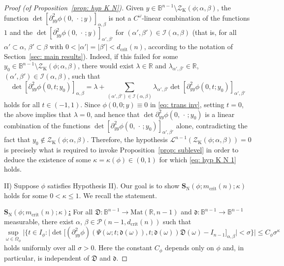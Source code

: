 \documentclass[reqno]{amsart}
\numberwithin{equation}{section}
\newcommand{\B}{\mathbb{B}}
\newcommand{\R}{\mathbb{R}}
\newcommand{\cI}{\mathcal{I}}
\newcommand{\cL}{\mathcal{L}}
\newcommand{\cP}{\mathcal{P}}
\newcommand{\cZ}{\mathcal{Z}}
\newcommand{\bS}{\mathbf{S}}
\newcommand{\fd}{\mathfrak{d}}
\newcommand{\fD}{\mathfrak{D}}
\theoremstyle{plain}
\theoremstyle{definition}
\newcommand{\tN}{\mathrm{N}}
\newcommand{\crit}{\mathrm{crit}}
\begin{document}
\begin{proof}[Proof (of Proposition~\ref{prop: hyp K N})]
Given $y\in \B^{n-1} \setminus \cZ_{\mathrm{K}}(\phi; \alpha, \beta)$, the function $\det [\partial^2_{yy}\phi (0,\,\cdot\,;y)]_{\alpha, \beta}$ is not a $C^\omega$-linear combination of the functions $1$ and the $\det[\partial^2_{yy}\phi(0,\,\cdot\,;y)]_{\alpha', \beta'}$ for $(\alpha',\beta')\in \cI(\alpha,\beta)$ (that is, for all $\alpha' \subset \alpha$, $\beta' \subset \beta$ with $0 < |\alpha'| = |\beta'| < d_{\crit}(n)$, according to the notation of Section~\ref{sec: main results}). Indeed, if this failed for some $y_0\in\B^{n-1} \setminus \cZ_{\mathrm{K}}(\phi; \alpha, \beta)$, there would exist $\lambda \in \R$ and $\lambda_{\alpha', \beta'}\in\R$, $(\alpha',\beta')\in \cI(\alpha,\beta)$, such that
\begin{equation*}
    \det[\partial^2_{yy}\phi(0,t;y_0)]_{\alpha, \beta} = \lambda + \sum_{{(\alpha', \beta') \in \cI(\alpha,\beta)}} \lambda_{\alpha', \beta'} \det[\partial^2_{yy}\phi(0,t;y_0)]_{\alpha', \beta'}
\end{equation*}
holds for all $t \in (-1,1)$. Since $\phi(0,0;y) \equiv 0$ in \eqref{eq: trans inv}, setting $t=0$, the above implies that $\lambda = 0$, and hence that $\det\partial^2_{yy}\phi(0,\,\cdot\,;y_0)$ is a linear combination of the functions $\det[\partial^2_{yy}\phi(0,\,\cdot\,;y_0)]_{\alpha', \beta'}$ alone, contradicting the fact that $y_0\notin \cZ_{\mathrm{K}}(\phi; \alpha, \beta)$. Therefore, the hypothesis  $\cL^{n-1}(\cZ_{\mathrm{K}}(\phi; \alpha, \beta)) = 0$ is precisely what is required to invoke Proposition~\ref{prop: sublevel} in order to deduce the existence of some $\kappa = \kappa(\phi) \in (0,1)$ for which \eqref{eq: hyp K N 1} holds. \medskip

\noindent II) Suppose $\phi$ satisfies Hypothesis II). Our goal is to show $\bS_{\tN}(\phi; m_{\crit}(n); \kappa)$ holds for some $0 < \kappa \leq 1$. We recall the statement. \medskip

\noindent \underline{\textbf{$\bS_{\tN}(\phi; m_{\crit}(n); \kappa)$:}} For all $\fD \colon \B^{n-1} \to \mathrm{Mat}(\R, n-1)$ and $\fd \colon \B^{n-1} \to \B^{n-1}$ measurable, there exist $\alpha$, $\beta \in \cP(n-1,d_{\crit}(n))$ such that
\begin{equation}\label{eq: hyp K N 2}
   \sup_{\omega \in \Omega_{\phi}} \Big|\Big\{ t \in I_{\phi}  : \Big|\det\Big [(\partial_{yy}^2 \phi)(\Psi(\omega; t; \fd(\omega)),t;\fd(\omega))\fD(\omega) - I_{n-1} \Big]_{\alpha,\beta}\Big| < \sigma \Big\}\Big| \leq C_{\phi} \sigma^{\kappa}
\end{equation}
holds uniformly over all $\sigma > 0$. Here the constant $C_{\phi}$ depends only on $\phi$ and, in particular, is independent of $\fD$ and $\fd$. \medskip


\end{proof}
\end{document}

